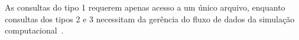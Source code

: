 As consultas do tipo 1 requerem apenas acesso a um único arquivo, enquanto consultas dos tipos 2 e 3 necessitam da gerência do fluxo de dados da simulação computacional~\cite{silva2015analyzing}.





